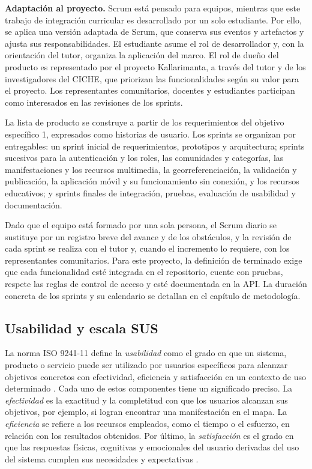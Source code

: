 \textbf{Adaptación al proyecto.} Scrum está pensado para equipos, mientras que este trabajo de integración curricular es desarrollado por un solo estudiante. Por ello, se aplica una versión adaptada de Scrum, que conserva sus eventos y artefactos y ajusta sus responsabilidades. El estudiante asume el rol de desarrollador y, con la orientación del tutor, organiza la aplicación del marco. El rol de dueño del producto es representado por el proyecto Kallarimanta, a través del tutor y de los investigadores del CICHE, que priorizan las funcionalidades según su valor para el proyecto. Los representantes comunitarios, docentes y estudiantes participan como interesados en las revisiones de los sprints.

La lista de producto se construye a partir de los requerimientos del objetivo específico 1, expresados como historias de usuario. Los sprints se organizan por entregables: un sprint inicial de requerimientos, prototipos y arquitectura; sprints sucesivos para la autenticación y los roles, las comunidades y categorías, las manifestaciones y los recursos multimedia, la georreferenciación, la validación y publicación, la aplicación móvil y su funcionamiento sin conexión, y los recursos educativos; y sprints finales de integración, pruebas, evaluación de usabilidad y documentación.

Dado que el equipo está formado por una sola persona, el Scrum diario se sustituye por un registro breve del avance y de los obstáculos, y la revisión de cada sprint se realiza con el tutor y, cuando el incremento lo requiere, con los representantes comunitarios. Para este proyecto, la definición de terminado exige que cada funcionalidad esté integrada en el repositorio, cuente con pruebas, respete las reglas de control de acceso y esté documentada en la API. La duración concreta de los sprints y su calendario se detallan en el capítulo de metodología.

\subsection{Usabilidad y escala SUS}
La norma ISO 9241-11 define la \textit{usabilidad} como el grado en que un sistema, producto o servicio puede ser utilizado por usuarios específicos para alcanzar objetivos concretos con efectividad, eficiencia y satisfacción en un contexto de uso determinado \cite{iso2018usability}. Cada uno de estos componentes tiene un significado preciso. La \textit{efectividad} es la exactitud y la completitud con que los usuarios alcanzan sus objetivos, por ejemplo, si logran encontrar una manifestación en el mapa. La \textit{eficiencia} se refiere a los recursos empleados, como el tiempo o el esfuerzo, en relación con los resultados obtenidos. Por último, la \textit{satisfacción} es el grado en que las respuestas físicas, cognitivas y emocionales del usuario derivadas del uso del sistema cumplen sus necesidades y expectativas \cite{iso2018usability}.

